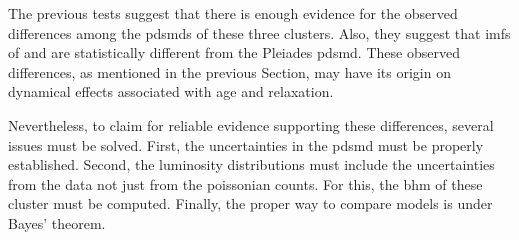 The previous tests suggest that there is enough evidence for the observed differences among the \glspl{pdsmd} of these three clusters. Also, they suggest that \glspl{imf} of \citet{Chabrier2005} and \citet{Thies2007} are statistically different from the  Pleiades \gls{pdsmd}.  These observed differences, as mentioned in the previous Section, may have its origin on dynamical effects associated with age and relaxation.

 Nevertheless, to claim for reliable evidence supporting these differences, several issues must be solved. First, the uncertainties in the \gls{pdsmd} must be properly established. Second, the luminosity distributions must include the uncertainties from the data not just from the poissonian counts. For this, the \gls{bhm} of these cluster must be computed. Finally, the proper way to compare models is under Bayes' theorem.
 




